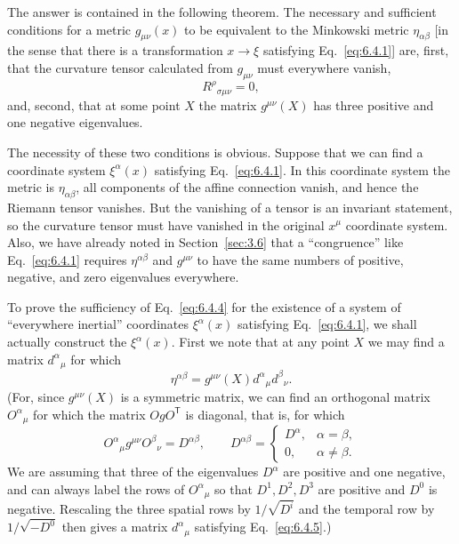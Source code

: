 The answer is contained in the following theorem. The necessary and
sufficient conditions for a metric \(g_{\mu\nu}(x)\) to be equivalent to the
Minkowski metric \(\eta_{\alpha\beta}\) [in the sense that there is a
transformation \(x\to\xi\) satisfying Eq.~\eqref{eq:6.4.1}] are, first, that
the curvature tensor calculated from \(g_{\mu\nu}\) must everywhere vanish,
\begin{equation}
  R^\rho{}_{\sigma\mu\nu}=0,
  \tag{6.4.4}\label{eq:6.4.4}
\end{equation}
and, second, that at some point \(X\) the matrix \(g^{\mu\nu}(X)\) has three
positive and one negative eigenvalues.

The necessity of these two conditions is obvious. Suppose that we can find a
coordinate system \(\xi^\alpha(x)\) satisfying Eq.~\eqref{eq:6.4.1}. In this
coordinate system the metric is \(\eta_{\alpha\beta}\), all components of the
affine connection vanish, and hence the Riemann tensor vanishes. But the
vanishing of a tensor is an invariant statement, so the curvature tensor must
have vanished in the original \(x^\mu\) coordinate system. Also, we have
already noted in Section~\ref{sec:3.6} that a ``congruence'' like
Eq.~\eqref{eq:6.4.1} requires \(\eta^{\alpha\beta}\) and \(g^{\mu\nu}\) to
have the same numbers of positive, negative, and zero eigenvalues everywhere.

To prove the sufficiency of Eq.~\eqref{eq:6.4.4} for the existence of a
system of ``everywhere inertial'' coordinates \(\xi^\alpha(x)\) satisfying
Eq.~\eqref{eq:6.4.1}, we shall actually construct the \(\xi^\alpha(x)\).
First we note that at any point \(X\) we may find a matrix
\(d^\alpha{}_\mu\) for which
\begin{equation}
  \eta^{\alpha\beta}
  =
  g^{\mu\nu}(X)d^\alpha{}_\mu d^\beta{}_\nu.
  \tag{6.4.5}\label{eq:6.4.5}
\end{equation}
(For, since \(g^{\mu\nu}(X)\) is a symmetric matrix, we can find an orthogonal
matrix \(O^\alpha{}_\mu\) for which the matrix \(OgO^{\mathsf T}\) is
diagonal, that is, for which
\[
  O^\alpha{}_\mu g^{\mu\nu}O^\beta{}_\nu=D^{\alpha\beta},
  \qquad
  D^{\alpha\beta}
  =
  \begin{cases}
    D^\alpha,&\alpha=\beta,\\
    0,&\alpha\ne\beta.
  \end{cases}
\]
We are assuming that three of the eigenvalues \(D^\alpha\) are positive and
one negative, and can always label the rows of \(O^\alpha{}_\mu\) so that
\(D^1,D^2,D^3\) are positive and \(D^0\) is negative. Rescaling the three
spatial rows by \(1/\sqrt{D^i}\) and the temporal row by
\(1/\sqrt{-D^0}\) then gives a matrix \(d^\alpha{}_\mu\) satisfying
Eq.~\eqref{eq:6.4.5}.)

